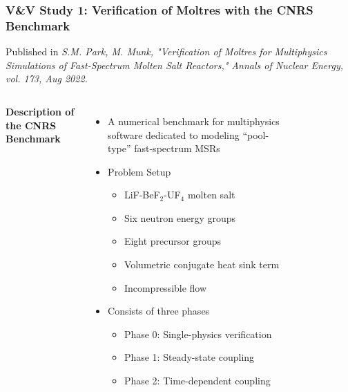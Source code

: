 \begin{frame}[noframenumbering]
  \frametitle{V\&V Study 1: Verification of Moltres with the CNRS Benchmark}

  Published in \textit{S.M. Park, M. Munk, "Verification of Moltres for Multiphysics Simulations of
    Fast-Spectrum Molten Salt Reactors," Annals of Nuclear Energy, vol. 173, Aug 2022.}
  \vspace{.2cm}

  \begin{columns}
    \column[t]{6.5cm}
    \textbf{Description of the CNRS Benchmark \cite{tiberga_results_2020}}
    \vspace{.2cm}

      \begin{itemize}
        \item A numerical benchmark for multiphysics software dedicated to modeling ``pool-type''
          fast-spectrum MSRs
        \item Problem Setup
          \begin{itemize}
            \item LiF-BeF$_2$-UF$_4$ molten salt
            \item Six neutron energy groups
            \item Eight precursor groups
            \item Volumetric conjugate heat sink term
            \item Incompressible flow
          \end{itemize}
        \item Consists of three phases
          \begin{itemize}
            \item Phase 0: Single-physics verification
            \item Phase 1: Steady-state coupling
            \item Phase 2: Time-dependent coupling
          \end{itemize}
      \end{itemize}
    \column[t]{3.5cm}
    \begin{figure}
      \centering

\end{figure}
\end{columns}
\end{frame}
